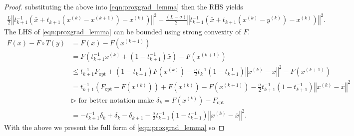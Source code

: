 \begin{proof}
        substituting the above into \hyperref[eqn:proxgrad_lemma]{\ref*{eqn:proxgrad_lemma}} then the RHS yields 
        \begin{align*}
            \frac{L}{2} \left\Vert
            t^{-1}_{k + 1}\left(
             \bar x + t_{k + 1} \left(
                 x^{(k)} - x^{(k + 1)}
             \right) - x^{(k)}
             \right)
            \right\Vert^2 - 
            \frac{(L - \sigma)}{2}
            \left\Vert
                t^{-1}_{k + 1}\left(
                    \bar x + t_{k + 1} \left(
                        x^{(k)} - y^{(k)}
                    \right) - x^{(k)}
                \right)
            \right\Vert^2. 
        \end{align*}
        The LHS of \hyperref[eqn:proxgrad_lemma]{\ref*{eqn:proxgrad_lemma}} can be bounded using strong convexity of $F$.
        \begin{align*}
            F(x) - F\circ T(y)
            &= F(x) - F\left(
                x^{(k + 1)}
            \right) 
            \\
            &= F\left(t_{k + 1}^{-1}x^{(k)} + (1 - t^{-1}_{k + 1})\bar x\right) - 
            F\left(x^{(k + 1)}\right)
            \\
            &\le 
            t_{k + 1}^{-1}F_{\text{opt}}
            + 
            (1 - t_{k + 1}^{-1})F\left(x^{(k)}\right)
            - 
            \frac{\sigma}{2}t^{-1}_k\left(1 - t^{-1}_{k + 1}\right)
            \left\Vert 
                x^{(k)} - \bar x
            \right\Vert^2 
            - F\left(x^{(k + 1)}\right)
            \\
            &= 
            t_{k + 1}^{-1} \left(
                F_{\text{opt}} - F\left(x^{(k)}\right)
            \right) + F\left(x^{(k)}\right) - F\left(x^{(k + 1)} \right)
            -
            \frac{\sigma}{2}t^{-1}_{k + 1}\left(1 - t^{-1}_{k + 1}\right)
            \left\Vert 
                x^{(k)} - \bar x
            \right\Vert^2 
            \\
            & \triangleright  \text{ for better notation make }\delta_k = F\left(x^{(k)}\right) - F_{\text{opt}}
            \\
            &= -t_{k + 1}^{-1}\delta_k + \delta_k  - \delta_{k + 1} 
            -
            \frac{\sigma}{2}t^{-1}_{k + 1}\left(1 - t^{-1}_{k + 1}\right)
            \left\Vert 
                x^{(k)} - \bar x
            \right\Vert^2. 
        \end{align*}
        With the above we present the full form of \hyperref[eqn:proxgrad_lemma]{\ref*{eqn:proxgrad_lemma}} so 

\end{proof}
